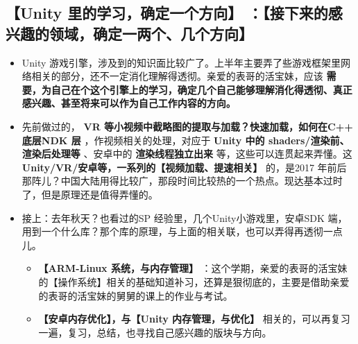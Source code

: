 \documentclass[9pt, b5paper]{article}
\begin{document}
\subsection{\textbf{【Unity 里的学习，确定一个方向】} ：【接下来的感兴趣的领域，确定一两个、几个方向】}
\label{sec-1-5}
\begin{itemize}
\item Unity 游戏引擎，涉及到的知识面比较广了。上半年主要弄了些游戏框架里网络相关的部分，还不一定消化理解得透彻。亲爱的表哥的活宝妹，应该 \textbf{需要，为自己在个这个引擎上的学习，确定几个自己能够理解消化得透彻、真正感兴趣、甚至将来可以作为自己工作内容的方向。}
\item 先前做过的， \textbf{VR 等小视频中截略图的提取与加载？快速加载，如何在C++ 底层NDK 层} ，作视频相关的处理，对应于 \textbf{Unity 中的 shaders/渲染前、渲染后处理等} 、安卓中的 \textbf{渲染线程独立出来} 等，这些可以连贯起来弄懂。这 \textbf{Unity/VR/安卓等，一系列的【视频加载、提速相关】} 的，是2017 年前后那阵儿？中国大陆用得比较广，那段时间比较热的一个热点。现达基本过时了，但是原理还是值得弄懂的。
\item 接上：去年秋天？也看过的SP 经验里，几个Unity小游戏里，安卓SDK 端，用到一个什么库？那个库的原理，与上面的相关联，也可以弄得再透彻一点儿。
\begin{itemize}
\item \textbf{【ARM-Linux 系统，与内存管理】} ：这个学期，亲爱的表哥的活宝妹的【操作系统】相关的基础知道补习，还算是狠彻底的，主要是借助亲爱的表哥的活宝妹的舅舅的课上的作业与考试。
\item \textbf{【安卓内存优化】，与【Unity 内存管理，与优化】} 相关的，可以再复习一遍，复习，总结，也寻找自己感兴趣的版块与方向。
\end{itemize}
\end{itemize}
\end{document}
